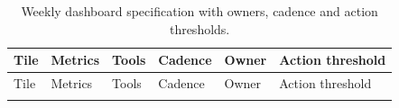 \documentclass[
  11pt,
]{article}
\begin{document}
\begin{longtable}[]{@{}
  >{\raggedright\arraybackslash}p{}
  >{\raggedright\arraybackslash}p{}
  >{\raggedright\arraybackslash}p{}
  >{\raggedright\arraybackslash}p{}
  >{\raggedright\arraybackslash}p{}
  >{\raggedright\arraybackslash}p{}@{}}
\caption{Weekly dashboard specification with owners, cadence and action
thresholds.}\tabularnewline
\toprule\noalign{}
\begin{minipage}[b]{\linewidth}\raggedright
Tile
\end{minipage} & \begin{minipage}[b]{\linewidth}\raggedright
Metrics
\end{minipage} & \begin{minipage}[b]{\linewidth}\raggedright
Tools
\end{minipage} & \begin{minipage}[b]{\linewidth}\raggedright
Cadence
\end{minipage} & \begin{minipage}[b]{\linewidth}\raggedright
Owner
\end{minipage} & \begin{minipage}[b]{\linewidth}\raggedright
Action threshold
\end{minipage} \\
\midrule\noalign{}
\endfirsthead
\toprule\noalign{}
\begin{minipage}[b]{\linewidth}\raggedright
Tile
\end{minipage} & \begin{minipage}[b]{\linewidth}\raggedright
Metrics
\end{minipage} & \begin{minipage}[b]{\linewidth}\raggedright
Tools
\end{minipage} & \begin{minipage}[b]{\linewidth}\raggedright
Cadence
\end{minipage} & \begin{minipage}[b]{\linewidth}\raggedright
Owner
\end{minipage} & \begin{minipage}[b]{\linewidth}\raggedright
Action threshold
\end{minipage} \\
\midrule\noalign{}

\end{longtable}
\end{document}
